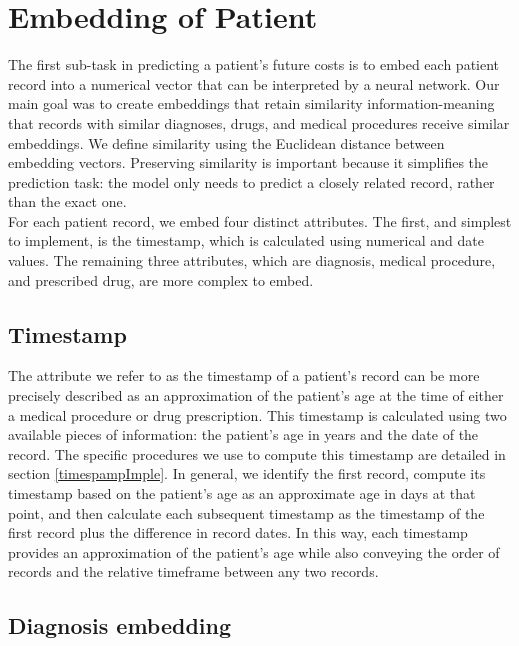 
\section{Embedding of Patient}
\label{embedding}

The first sub-task in predicting a patient’s future costs is to embed each patient record into a numerical vector that can be interpreted by a neural network. Our main goal was to create embeddings that retain similarity information-meaning that records with similar diagnoses, drugs, and medical procedures receive similar embeddings. We define similarity using the Euclidean distance between embedding vectors. Preserving similarity is important because it simplifies the prediction task: the model only needs to predict a closely related record, rather than the exact one.
\\

For each patient record, we embed four distinct attributes. The first, and simplest to implement, is the timestamp, which is calculated using numerical and date values. The remaining three attributes, which are diagnosis, medical procedure, and prescribed drug, are more complex to embed.

\subsection{Timestamp}

The attribute we refer to as the timestamp of a patient’s record can be more precisely described as an approximation of the patient’s age at the time of either a medical procedure or drug prescription. This timestamp is calculated using two available pieces of information: the patient’s age in years and the date of the record. The specific procedures we use to compute this timestamp are detailed in section \ref{timespampImple}. In general, we identify the first record, compute its timestamp based on the patient’s age as an approximate age in days at that point, and then calculate each subsequent timestamp as the timestamp of the first record plus the difference in record dates. In this way, each timestamp provides an approximation of the patient’s age while also conveying the order of records and the relative timeframe between any two records.

\subsection{Diagnosis embedding}
\label{diagEmb}


